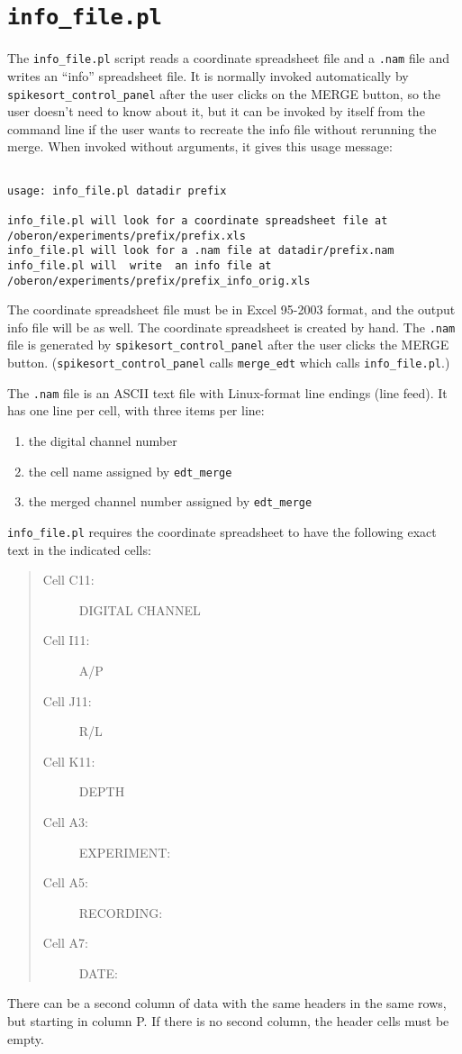\documentclass{article}
\begin{document}
\section{\tt info\_file.pl}
The {\tt info\_file.pl} script reads a coordinate spreadsheet file and
a {\tt .nam} file and writes an ``info'' spreadsheet file.  It is
normally invoked automatically by \verb#spikesort_control_panel# after
the user clicks on the MERGE button, so the user doesn't need to know
about it, but it can be invoked by itself from the command line if the
user wants to recreate the info file without rerunning the merge.
When invoked without arguments, it gives this usage message:
\begin{adjustwidth}{-8em}{}
\begin{verbatim}

usage: info_file.pl datadir prefix

info_file.pl will look for a coordinate spreadsheet file at /oberon/experiments/prefix/prefix.xls
info_file.pl will look for a .nam file at datadir/prefix.nam
info_file.pl will  write  an info file at /oberon/experiments/prefix/prefix_info_orig.xls

\end{verbatim}
\end{adjustwidth}
The coordinate spreadsheet file must be in Excel 95-2003 format, and
the output info file will be as well.  The coordinate spreadsheet is
created by hand.  The {\tt .nam} file is generated by
\verb#spikesort_control_panel# after the user clicks the MERGE
button. (\verb#spikesort_control_panel# calls \verb#merge_edt# which
calls  {\tt info\_file.pl}.)

The {\tt .nam} file is an ASCII text file with Linux-format line
endings (line feed).  It has one line per cell, with three items per
line:
\begin{enumerate}
\item the digital channel number
\item the cell name assigned by \verb#edt_merge#
\item the merged channel number assigned by \verb#edt_merge#
\end{enumerate}

{\tt info\_file.pl} requires the coordinate spreadsheet to have the
following exact text in the indicated cells:
\begin{quote}
\begin{description}
\item[Cell C11:] DIGITAL CHANNEL
\item[Cell I11:] A/P
\item[Cell J11:] R/L
\item[Cell K11:] DEPTH
\item[Cell A3:] EXPERIMENT:
\item[Cell A5:] RECORDING:
\item[Cell A7:] DATE:
\end{description}
\end{quote}
There can be a second column of data with the same headers in the same
rows, but starting in column P.  If there is no second column, the
header cells must be empty.
\end{document}
